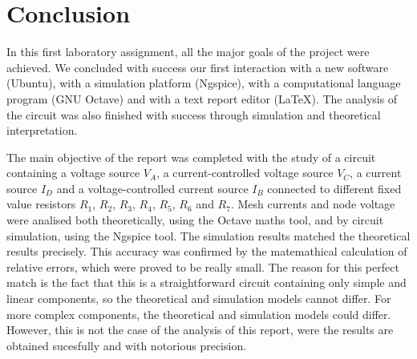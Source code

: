\section{Conclusion}
\label{sec:conclusion}



In this first laboratory assignment, all the major goals of the project were achieved. We concluded with success our first interaction with a new software (Ubuntu), with a simulation platform (Ngspice), with a computational language program (GNU Octave) and with a text report editor (LaTeX). The analysis of the circuit was also finished with success through simulation and theoretical interpretation.

The main objective of the report was completed with the study of a circuit containing a voltage source $V_A$, a current-controlled voltage source $V_C$, a current source $I_D$ and a voltage-controlled current source $I_B$ connected to different fixed value resistors $R_1$, $R_2$, $R_3$, $R_4$, $R_5$, $R_6$ and $R_7$. Mesh currents and node voltage were analised both theoretically, using the Octave maths tool, and by circuit simulation, using the Ngspice tool. The simulation results matched the theoretical results precisely. This accuracy was confirmed by the matemathical calculation of relative errors, which were proved to be really small. The reason for this perfect match is the fact that this is a straightforward
circuit containing only simple and linear components, so the theoretical and simulation models cannot differ. For more complex components, the theoretical and simulation models could differ. However, this is not the case of the analysis of this report, were the results are obtained sucesfully and with notorious precision.
